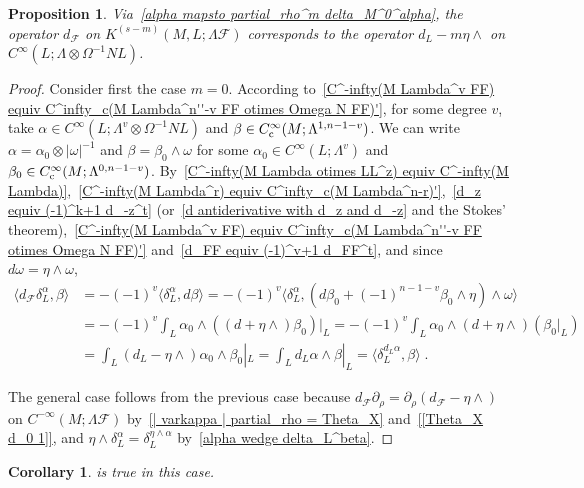 \documentclass{memo-l}
\theoremstyle{plain}
\newtheorem{cor}[thm]{Corollary}
\newtheorem{prop}[thm]{Proposition}
\theoremstyle{definition}
\theoremstyle{remark}
\newcommand{\FF}{\mathcal{F}}
\newcommand{\Cinftyc}{C^\infty_{\text{\rm c}}}
\numberwithin{section}{chapter}
\numberwithin{equation}{section}%
\begin{document}
\begin{prop}\label{p: d_FF corresponds to d_L - m theta wedge}
Via~\eqref{alpha mapsto partial_rho^m delta_M^0^alpha}, the operator $d_\FF$ on $K^{(s-m)}(M,L;\Lambda\FF)$ corresponds to the operator $d_L-m{\eta\wedge}$ on $C^\infty(L;\Lambda\otimes\Omega^{-1}NL)$.
\end{prop}

\begin{proof}
Consider first the case $m=0$. According to~\eqref{C^-infty(M Lambda^v FF) equiv C^infty_c(M Lambda^n''-v FF otimes Omega N FF)'}, for some degree $v$, take $\alpha\in C^\infty(L;\Lambda^v\otimes\Omega^{-1}NL)$ and $\beta\in\Cinftyc(M;\Lambda^{1,n-1-v})$. We can write $\alpha=\alpha_0\otimes|\omega|^{-1}$ and $\beta=\beta_0\wedge\omega$ for some $\alpha_0\in C^\infty(L;\Lambda^v)$ and $\beta_0\in\Cinftyc(M;\Lambda^{0,n-1-v})$. By~\eqref{C^-infty(M Lambda otimes LL^z) equiv C^-infty(M Lambda)},~\eqref{C^-infty(M Lambda^r) equiv C^infty_c(M Lambda^n-r)'},~\eqref{d_z equiv (-1)^k+1 d_-z^t} (or~\eqref{d antiderivative with d_z and d_-z} and the Stokes' theorem),~\eqref{C^-infty(M Lambda^v FF) equiv C^infty_c(M Lambda^n''-v FF otimes Omega N FF)'} and~\eqref{d_FF equiv (-1)^v+1 d_FF^t}, and since $d\omega=\eta\wedge\omega$,
\begin{align*}
\langle d_\FF\delta_L^\alpha,\beta\rangle
&=-(-1)^v\langle \delta_L^\alpha,d\beta\rangle
=-(-1)^v\langle \delta_L^\alpha,(d\beta_0+(-1)^{n-1-v}\beta_0\wedge\eta)\wedge\omega\rangle\\
&=-(-1)^v\int_L\alpha_0\wedge((d+\eta\wedge)\beta_0)|_L=-(-1)^v\int_L\alpha_0\wedge(d+\eta\wedge)(\beta_0|_L)\\
&=\int_L(d_L-\eta\wedge)\alpha_0\wedge\beta_0|_L
=\int_Ld_L\alpha\wedge\beta|_L=\langle\delta_L^{d_L\alpha},\beta\rangle\;.
\end{align*}

The general case follows from the previous case because $d_\FF\partial_\rho=\partial_\rho(d_\FF-{\eta\wedge})$ on $C^{-\infty}(M;\Lambda\FF)$ by~\eqref{| varkappa | partial_rho = Theta_X} and~\eqref{[Theta_X d_0 1]}, and $\eta\wedge\delta_L^\alpha=\delta_L^{\eta\wedge\alpha}$ by~\eqref{alpha wedge delta_L^beta}.
\end{proof}

\begin{cor}\label{c: K(M M^0 Lambda FF) equiv bigoplus_L bigoplus_k C^infty(L Lambda) suspension}
 is true in this case.
\end{cor}
\end{document}
